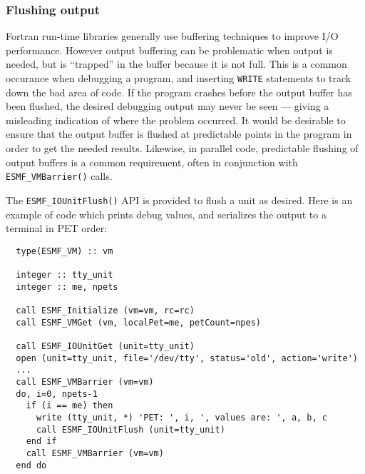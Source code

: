 \subsubsection{Flushing output}

Fortran run-time libraries generally use buffering techniques to improve I/O
performance.  However output buffering can be problematic when output is needed,
but is ``trapped'' in the buffer because it is not full.
This is a common occurance when debugging a program, and inserting {\tt WRITE} statements
to track down the bad area of code.  If the program crashes before the output
buffer has been flushed, the desired debugging output may never be seen --- giving
a misleading indication of where the problem occurred.  It would be desirable
to ensure that the output buffer is flushed at predictable
points in the program in order to get the needed results.
Likewise, in parallel code, predictable flushing of output buffers is a common
requirement, often in conjunction with {\tt ESMF\_VMBarrier()} calls.  

The {\tt ESMF\_IOUnitFlush()} API is provided to flush a unit as desired.  Here is
an example of code which prints debug values, and serializes the output to a
terminal in PET order:

\begin{verbatim}
  type(ESMF_VM) :: vm

  integer :: tty_unit
  integer :: me, npets

  call ESMF_Initialize (vm=vm, rc=rc)
  call ESMF_VMGet (vm, localPet=me, petCount=npes)

  call ESMF_IOUnitGet (unit=tty_unit)
  open (unit=tty_unit, file='/dev/tty', status='old', action='write')
  ...
  call ESMF_VMBarrier (vm=vm)
  do, i=0, npets-1
    if (i == me) then
      write (tty_unit, *) 'PET: ', i, ', values are: ', a, b, c
      call ESMF_IOUnitFlush (unit=tty_unit)
    end if
    call ESMF_VMBarrier (vm=vm)
  end do
\end{verbatim}
